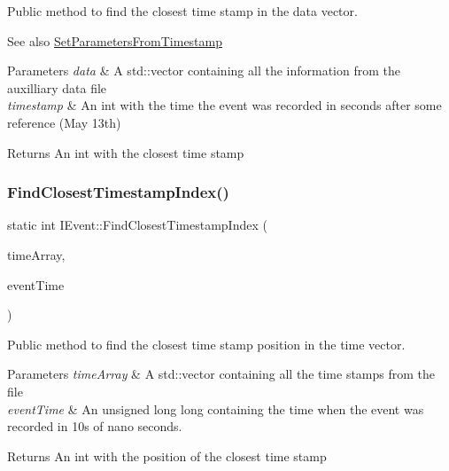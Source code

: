 Public method to find the closest time stamp in the data vector. 

\begin{DoxySeeAlso}{See also}
\hyperlink{classIEvent_a353512fe50f24076e44296f2b0b49519}{Set\+Parameters\+From\+Timestamp}
\end{DoxySeeAlso}

\begin{DoxyParams}{Parameters}
{\em data} & A std\+::vector containing all the information from the auxilliary data file \\
\hline
{\em timestamp} & An int with the time the event was recorded in seconds after some reference (May 13th) \\
\hline
\end{DoxyParams}
\begin{DoxyReturn}{Returns}
An int with the closest time stamp 
\end{DoxyReturn}
\mbox{\label{classIEvent_a07a5131ed389666370575f89b182816a}} 
\subsubsection{\texorpdfstring{Find\+Closest\+Timestamp\+Index()}{FindClosestTimestampIndex()}}
{\footnotesize\ttfamily static int I\+Event\+::\+Find\+Closest\+Timestamp\+Index (\begin{DoxyParamCaption}\item[{std\+::vector$<$ unsigned long long $>$}]{time\+Array,  }\item[{unsigned long long}]{event\+Time }\end{DoxyParamCaption})\hspace{0.3cm}{\ttfamily [static]}}



Public method to find the closest time stamp position in the time vector. 


\begin{DoxyParams}{Parameters}
{\em time\+Array} & A std\+::vector containing all the time stamps from the file \\
\hline
{\em event\+Time} & An unsigned long long containing the time when the event was recorded in 10s of nano seconds. \\
\hline
\end{DoxyParams}
\begin{DoxyReturn}{Returns}
An int with the position of the closest time stamp 
\end{DoxyReturn}
\mbox{\label{classIEvent_a0abf87cd9bf704b8ab01ec6b7779f859}} 
